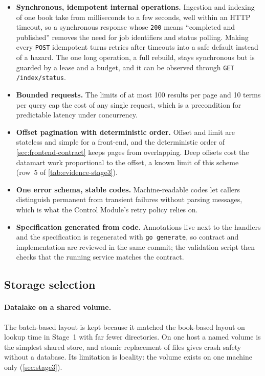 \documentclass[10pt,a4paper]{article}
\newcommand{\code}[1]{\texttt{#1}}
\newcommand{\route}[1]{\texttt{#1}}
\begin{document}
\begin{itemize}
  \item \textbf{Synchronous, idempotent internal operations.} Ingestion and
  indexing of one book take from milliseconds to a few seconds, well within an
  HTTP timeout, so a synchronous response whose \code{200} means ``completed
  and published'' removes the need for job identifiers and status polling.
  Making every \code{POST} idempotent turns retries after timeouts into a safe
  default instead of a hazard. The one long operation, a full rebuild, stays
  synchronous but is guarded by a lease and a budget, and it can be observed
  through \route{GET /index/status}.
  \item \textbf{Bounded requests.} The limits of at most 100 results per page
  and 10 terms per query cap the cost of any single request, which is a
  precondition for predictable latency under concurrency.
  \item \textbf{Offset pagination with deterministic order.} Offset and limit
  are stateless and simple for a front-end, and the deterministic order of
  \cref{sec:frontend-contract} keeps pages from overlapping. Deep offsets cost
  the datamart work proportional to the offset, a known limit of this scheme
  (row~5 of \cref{tab:evidence-stage3}).
  \item \textbf{One error schema, stable codes.} Machine-readable codes let
  callers distinguish permanent from transient failures without parsing
  messages, which is what the Control Module's retry policy relies on.
  \item \textbf{Specification generated from code.} Annotations live next to
  the handlers and the specification is regenerated with \code{go generate},
  so contract and implementation are reviewed in the same commit; the
  validation script then checks that the running service matches the contract.
\end{itemize}

\subsection{Storage selection}
\label{sec:decision-storage}

\paragraph{Datalake on a shared volume.}
The batch-based layout is kept because it matched the book-based layout on
lookup time in Stage~1 with far fewer directories. On one host a named volume is
the simplest shared store, and atomic replacement of files gives crash safety
without a database. Its limitation is locality: the volume exists on one
machine only (\cref{sec:stage3}).
\end{document}
